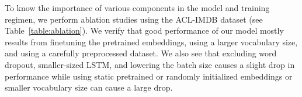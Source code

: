 \documentclass[letterpaper]{article}
\begin{document}
\begin{table}[t]
\small
\centering
{}
\caption{Error rates (\%) of variations on the BiLSTM model trained using  on the ACL-IMDB dataset. Unlisted values are identical to those of the first row;  = number of BiLSTM layers;  = LSTM hidden size.}
\label{table:ablation}
\end{table}

To know the importance of various components in the model and training regimen, we perform ablation studies using the ACL-IMDB dataset (see Table~\ref{table:ablation}). We verify that good performance of our model mostly results from finetuning the pretrained embeddings, using a larger vocabulary size, and using a carefully preprocessed dataset. We also see that excluding word dropout, smaller-sized LSTM, and lowering the batch size causes a slight drop in performance while using static pretrained or randomly initialized embeddings or smaller vocabulary size can cause a large drop.
\end{document}
